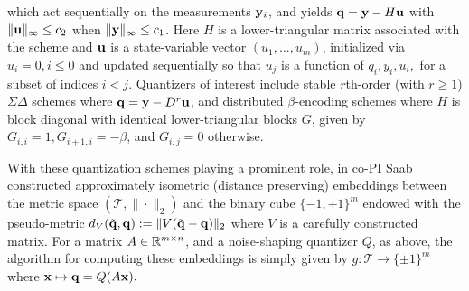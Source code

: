 \fi 
which act sequentially on the measurements $\mathbf{y}_i$, %
%
%
and yields $\mathbf{q}=\mathbf{y} - H\mathbf{u}$ with $\|\mathbf{u}\|_\infty \leq c_2$ when $\|\mathbf{y}\|_\infty \leq c_1$. 
Here $H$ is a lower-triangular matrix associated with the scheme and $\mathbf{u}$ is a state-variable vector $(u_1,...,u_m)$, initialized via $u_i=0, i\leq 0$ and updated sequentially so that $u_j$ is a function of $q_i, y_i, u_i,$ for a subset of indices $i < j$. Quantizers of interest include
stable $r$th-order (with $r\geq 1$) $\Sigma\Delta$ schemes  \cite{daubechies2003approximating} where  $\mathbf{q}= \mathbf{y} - D^r \mathbf{u}$, and distributed $\beta$-encoding schemes \cite{chou2016distributed} where $H$ is block diagonal with identical lower-triangular blocks $G$, given by $G_{i,i}=1, G_{i+1,i}=-\beta$, and $G_{i,j}=0$ otherwise.

With these quantization schemes playing a prominent role, in  \cite{huynh2018fast} co-PI Saab  constructed approximately isometric (distance preserving) embeddings between the metric space  $(\mathcal{T}, \|\cdot\|_2)$ and the binary  cube $\{-1,+1\}^m$ endowed with the pseudo-metric
$d_{{V}}(\tilde{\mathbf{q}},\mathbf{q}) := \| {V}(\tilde{\mathbf{q}} -{\mathbf{q}}) \|_2$
where $V$ is a carefully constructed matrix.
For a  matrix $A\in\mathbb{R}^{m\times n}$, and a noise-shaping quantizer $Q$, as above, the algorithm for computing these embeddings is simply given by $g: \mathcal{T} \to \{\pm 1\}^m\nonumber$ where $\mathbf{x} \mapsto \mathbf{q}=Q(A\mathbf{x}).\nonumber$
\iffalse
\begin{align}
g: \mathcal{T} &\to \{\pm 1\}^m\nonumber\quad \text{where} \quad
\x \mapsto \q=Q(A\x).\nonumber
\end{align}
\fi

